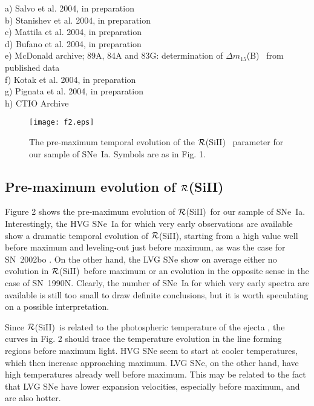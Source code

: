 \documentclass[preprint2]{aastex}
\newcommand{\dm}{$\Delta m_{15}$(B)}
\newcommand{\RSi}{$\cal R$(SiII)}
\begin{document}
\begin{table*}
\begin{flushleft}
a) Salvo et al. 2004, in preparation\\


b) Stanishev et al. 2004, in preparation\\

c) Mattila et al. 2004, in preparation\\

d) Bufano et al. 2004, in preparation\\

e) McDonald archive; 89A, 84A and 83G: determination of \dm~ from published data\\

f) Kotak et al. 2004, in preparation\\

g) Pignata et al. 2004, in preparation\\

h) CTIO Archive\\

\end{flushleft}
\end{table*}

\begin{figure}[t]
\texttt{[image: f2.eps]}
\caption{The pre-maximum temporal evolution of the \RSi~ parameter for
our sample of SNe~Ia. Symbols are as in Fig. 1.}
\end{figure}

\subsection{Pre-maximum evolution of \RSi}

Figure 2 shows the pre-maximum evolution of \RSi\ for our sample of
SNe~Ia.  Interestingly, the HVG SNe~Ia for which very early
observations are available show a dramatic temporal evolution of \RSi,
starting from a high value well before maximum and leveling-out just
before maximum, as was the case for SN~2002bo \citep{ben04}. On the
other hand, the LVG SNe show on average either no evolution in \RSi\
before maximum or an evolution in the opposite sense in the case of
SN~1990N.  Clearly, the number of SNe~Ia for which very early spectra
are available is still too small to draw definite conclusions, but it
is worth speculating on a possible interpretation.

Since \RSi\ is related to the photospheric temperature of the ejecta
\citep{nug95}, the curves in Fig. 2 should trace the temperature
evolution in the line forming regions before maximum light.  HVG SNe seem to
start at cooler temperatures, which then increase approaching maximum. LVG SNe,
on the other hand, have high temperatures already well before maximum.
This may be related to the fact that LVG SNe have lower expansion velocities,
especially before maximum, and are also hotter. 
\end{document}
